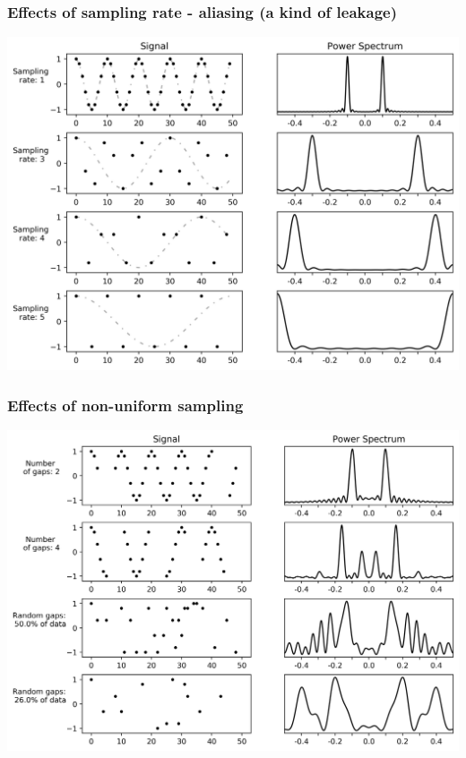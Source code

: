 \documentclass{beamer}
\begin{document}
\begin{frame}
\frametitle{Effects of sampling rate - aliasing (a kind of leakage)}
\begin{center}
\includegraphics[scale=0.55]{Figuras/fig2.jpg}
\end{center}
\end{frame}

\begin{frame}
\frametitle{Effects of non-uniform sampling}
\begin{center}
\includegraphics[scale=0.55]{Figuras/fig3.jpg}
\end{center}
\end{frame}
\end{document}
